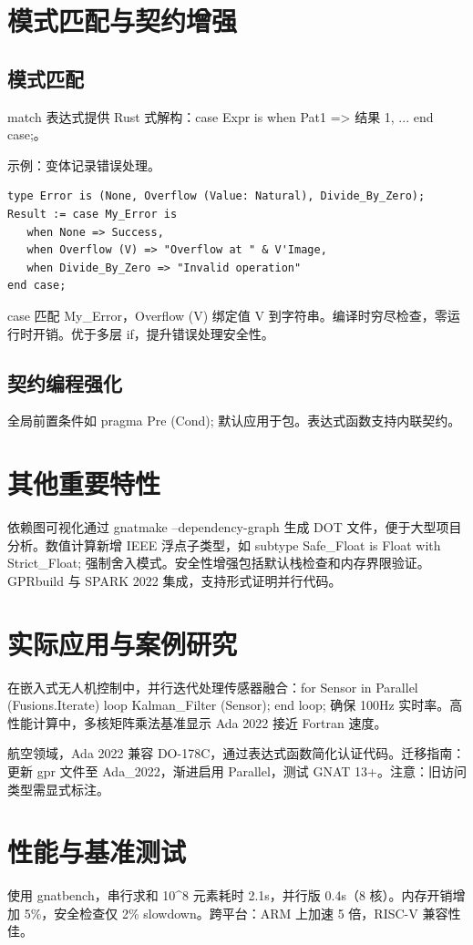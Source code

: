 \chapter{模式匹配与契约增强}
\section{模式匹配}
match 表达式提供 Rust 式解构：case Expr is when Pat1 => 结果 1, ... end case;。\par
示例：变体记录错误处理。\par
\begin{lstlisting}
type Error is (None, Overflow (Value: Natural), Divide_By_Zero);
Result := case My_Error is
   when None => Success,
   when Overflow (V) => "Overflow at " & V'Image,
   when Divide_By_Zero => "Invalid operation"
end case;
\end{lstlisting}
case 匹配 My\_{}Error，Overflow (V) 绑定值 V 到字符串。编译时穷尽检查，零运行时开销。优于多层 if，提升错误处理安全性。\par
\section{契约编程强化}
全局前置条件如 pragma Pre (Cond); 默认应用于包。表达式函数支持内联契约。\par
\chapter{其他重要特性}
依赖图可视化通过 gnatmake --dependency-graph 生成 DOT 文件，便于大型项目分析。数值计算新增 IEEE 浮点子类型，如 subtype Safe\_{}Float is Float with Strict\_{}Float; 强制舍入模式。安全性增强包括默认栈检查和内存界限验证。GPRbuild 与 SPARK 2022 集成，支持形式证明并行代码。\par
\chapter{实际应用与案例研究}
在嵌入式无人机控制中，并行迭代处理传感器融合：for Sensor in Parallel (Fusions.Iterate) loop Kalman\_{}Filter (Sensor); end loop; 确保 100Hz 实时率。高性能计算中，多核矩阵乘法基准显示 Ada 2022 接近 Fortran 速度。\par
航空领域，Ada 2022 兼容 DO-178C，通过表达式函数简化认证代码。迁移指南：更新 gpr 文件至 Ada\_{}2022，渐进启用 Parallel，测试 GNAT 13+。注意：旧访问类型需显式标注。\par
\chapter{性能与基准测试}
使用 gnatbench，串行求和 10\^{}8 元素耗时 2.1s，并行版 0.4s（8 核）。内存开销增加 5\%{}，安全检查仅 2\%{}  slowdown。跨平台：ARM 上加速 5 倍，RISC-V 兼容性佳。\par
